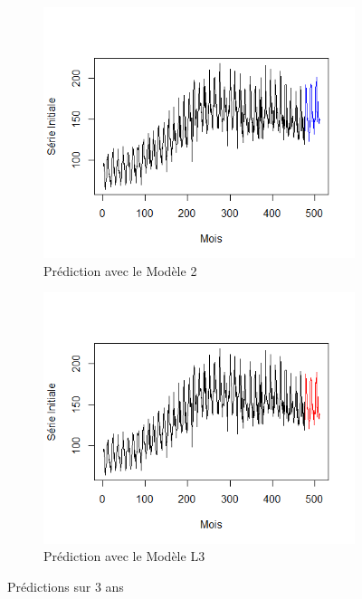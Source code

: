 \documentclass[12pt,a4paper]{book}
\newcommand{\1}{\mathds{1}}
\begin{document}
\begin{figure}[h!]
	\begin{subfigure}{.5\textwidth}
  		\centering
    	\includegraphics[width=\textwidth]{pred_mod2}  
    	\caption{Prédiction avec le Modèle 2}
    	\label{fig:sub1}
    \end{subfigure}
    \begin{subfigure}{.5\textwidth}
    	\centering
    	\includegraphics[width=\textwidth]{pred_modL3}  
    	\caption{Prédiction avec le Modèle L3}
    	\label{fig:sub2}
    \end{subfigure}

\caption{Prédictions sur 3 ans}
\end{figure}
\end{document}
